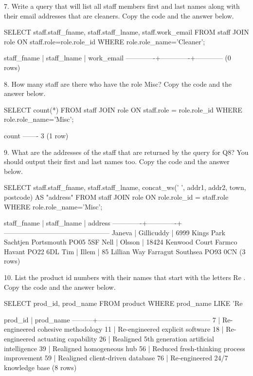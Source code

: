 7. Write a query that will list all staff members first and last names along with their email addresses that are cleaners. Copy the code and the answer below.
\begin{sql}
SELECT staff.staff_fname, staff.staff_lname, staff.work_email FROM staff
JOIN role ON staff.role=role.role_id
WHERE role.role_name='Cleaner';
\end{sql}
\begin{pseudo*}
 staff_fname | staff_lname | work_email
-------------+-------------+------------
(0 rows)
\end{pseudo*}

8. How many staff are there who have the role Misc? Copy the code and the answer below.
\begin{sql}
SELECT count(*) FROM staff
JOIN role ON staff.role = role.role_id
WHERE role.role_name='Misc';
\end{sql}
\begin{pseudo*}
 count
-------
     3
(1 row)
\end{pseudo*}

9. What are the addresses of the staff that are returned by the query for Q8? You should output their first and last names too. Copy the code and the answer below.
\begin{sql}
SELECT staff.staff_fname, staff.staff_lname, concat_ws(' ', addr1, addr2, town, postcode) AS "address"
FROM staff
JOIN role ON role.role_id = staff.role
WHERE role.role_name='Misc';
\end{sql}
\begin{pseudo*}
 staff_fname | staff_lname |                    address
-------------+-------------+-----------------------------------------------
 Janeva      | Gillicuddy  | 6999 Kings Park Sachtjen Portsmouth PO05 5SF
 Nell        | Olsson      | 18424 Kenwood Court Farmco Havant PO22 6DL
 Tim         | Illem       | 85 Lillian Way Farragut Southsea PO93 0CN
(3 rows)
\end{pseudo*}

10. List the product id numbers with their names that start with the letters Re . Copy the code and the answer below.
\begin{sql}
SELECT prod_id, prod_name FROM product
WHERE prod_name LIKE 'Re%
\end{sql}
\begin{pseudo*}
 prod_id |                    prod_name
---------+--------------------------------------------------
       7 | Re-engineered cohesive methodology
      11 | Re-engineered explicit software
      18 | Re-engineered actuating capability
      26 | Realigned 5th generation artificial intelligence
      39 | Realigned homogeneous hub
      56 | Reduced fresh-thinking process improvement
      59 | Realigned client-driven database
      76 | Re-engineered 24/7 knowledge base
(8 rows)
\end{pseudo*}

